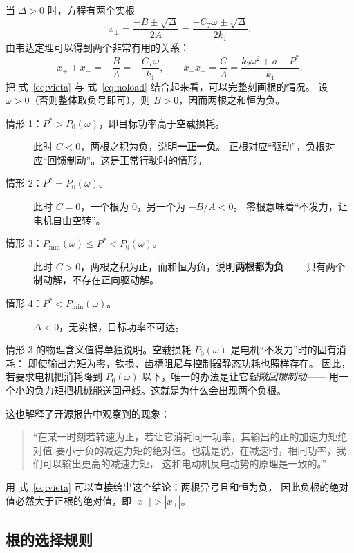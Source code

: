 \documentclass[cn,blue,11pt,device=normal]{elegantnote}
\newcommand{\CT}{C_{T}{}}
\newcommand{\fref}[1]{式~\eqref{#1}}
\begin{document}
当 $\Delta>0$ 时，方程有两个实根
\begin{equation}\label{eq:roots}
  x_{\pm} = \frac{-B \pm \sqrt{\Delta}}{2A}
          = \frac{-\CT\omega \pm \sqrt{\Delta}}{2k_1}.
\end{equation}
由韦达定理可以得到两个非常有用的关系：
\begin{equation}\label{eq:vieta}
  x_+ + x_- = -\frac{B}{A} = -\frac{\CT\omega}{k_1},
  \qquad
  x_+ x_- = \frac{C}{A} = \frac{k_2\omega^2 + a - P^{\ast}}{k_1}.
\end{equation}
把 \fref{eq:vieta} 与 \fref{eq:noload} 结合起来看，可以完整刻画根的情况。
设 $\omega>0$（否则整体取负号即可），则 $B>0$，因而两根之和恒为负。

\begin{description}
  \item[情形 1：$P^{\ast} > P_0(\omega)$，即目标功率高于空载损耗。]
  此时 $C<0$，两根之积为负，说明\textbf{一正一负}。
  正根对应“驱动”，负根对应“回馈制动”。这是正常行驶时的情形。
  \item[情形 2：$P^{\ast} = P_0(\omega)$。] 此时 $C=0$，一个根为 $0$，另一个为 $-B/A<0$。
  零根意味着“不发力，让电机自由空转”。
  \item[情形 3：$P_{\min}(\omega) \le P^{\ast} < P_0(\omega)$。]
  此时 $C>0$，两根之积为正，而和恒为负，说明\textbf{两根都为负}——
  只有两个制动解，不存在正向驱动解。
  \item[情形 4：$P^{\ast} < P_{\min}(\omega)$。] $\Delta<0$，无实根，目标功率不可达。
\end{description}

情形 3 的物理含义值得单独说明。空载损耗 $P_0(\omega)$ 是电机“不发力”时的固有消耗：
即使输出力矩为零，铁损、齿槽阻尼与控制器静态功耗也照样存在。
因此，若要求电机把消耗降到 $P_0(\omega)$ 以下，唯一的办法是让它\emph{轻微回馈制动}——
用一个小的负力矩把机械能送回母线。这就是为什么会出现两个负根。

这也解释了开源报告中观察到的现象：

\begin{quote}
“在某一时刻若转速为正，若让它消耗同一功率，其输出的正的加速力矩绝对值
要小于负的减速力矩的绝对值。也就是说，在减速时，相同功率，我们可以输出更高的减速力矩，
这和电动机反电动势的原理是一致的。”
\end{quote}

用 \fref{eq:vieta} 可以直接给出这个结论：两根异号且和恒为负，
因此负根的绝对值必然大于正根的绝对值，即 $|x_-|>|x_+|$。

\subsection{根的选择规则}
\end{document}
